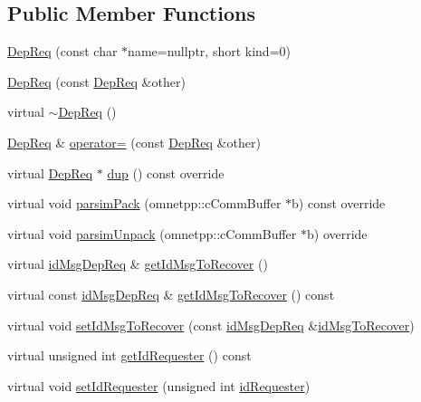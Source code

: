 \subsection*{Public Member Functions}
\begin{DoxyCompactItemize}
\item 
\hyperlink{class_dep_req_a133b51d43699e8ebecccf069935d93c4}{Dep\+Req} (const char $\ast$name=nullptr, short kind=0)
\item 
\hyperlink{class_dep_req_adf6800c87693c1de5b88d89c577186b8}{Dep\+Req} (const \hyperlink{class_dep_req}{Dep\+Req} \&other)
\item 
virtual \hyperlink{class_dep_req_a6f770d0327bf43dcef5f6a58f5a32183}{$\sim$\+Dep\+Req} ()
\item 
\hyperlink{class_dep_req}{Dep\+Req} \& \hyperlink{class_dep_req_a343eae743e4ca183897f0af8410d5ba3}{operator=} (const \hyperlink{class_dep_req}{Dep\+Req} \&other)
\item 
virtual \hyperlink{class_dep_req}{Dep\+Req} $\ast$ \hyperlink{class_dep_req_a430632dbd4f70a3a1183f226f0484bf3}{dup} () const override
\item 
virtual void \hyperlink{class_dep_req_a94c2def7b925be45621e20fd31e28e77}{parsim\+Pack} (omnetpp\+::c\+Comm\+Buffer $\ast$b) const override
\item 
virtual void \hyperlink{class_dep_req_a4fa8adb572938bc44f0a04463ea2df8d}{parsim\+Unpack} (omnetpp\+::c\+Comm\+Buffer $\ast$b) override
\item 
virtual \hyperlink{dep_req__m_8h_a2bbb71ed0e9660ec02d81471eafd9c29}{id\+Msg\+Dep\+Req} \& \hyperlink{class_dep_req_abbf56cc3e6a0be7ff696f9216f51f968}{get\+Id\+Msg\+To\+Recover} ()
\item 
virtual const \hyperlink{dep_req__m_8h_a2bbb71ed0e9660ec02d81471eafd9c29}{id\+Msg\+Dep\+Req} \& \hyperlink{class_dep_req_ab173923214b88b6c4b2f1d1cee8313d0}{get\+Id\+Msg\+To\+Recover} () const
\item 
virtual void \hyperlink{class_dep_req_a488a57f56c5fc87aae853a2b3e469fd0}{set\+Id\+Msg\+To\+Recover} (const \hyperlink{dep_req__m_8h_a2bbb71ed0e9660ec02d81471eafd9c29}{id\+Msg\+Dep\+Req} \&\hyperlink{class_dep_req_a8547e169d4670212c0b612924dda94cc}{id\+Msg\+To\+Recover})
\item 
virtual unsigned int \hyperlink{class_dep_req_a68f528e65d1529da94226f8a83483d6c}{get\+Id\+Requester} () const
\item 
virtual void \hyperlink{class_dep_req_a27f6e58ad8dcf4902de1042322a3e6e7}{set\+Id\+Requester} (unsigned int \hyperlink{class_dep_req_a26936e95ef3fae4753d2442318646c6b}{id\+Requester})

\end{DoxyCompactItemize}
